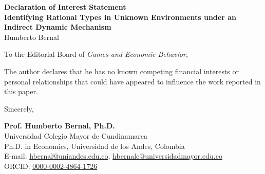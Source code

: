 \documentclass[12pt]{article}
\begin{document}
\singlespacing

\begin{center}
\textbf{Declaration of Interest Statement} \\
\vspace{1em}
\textbf{Identifying Rational Types in Unknown Environments under an Indirect Dynamic Mechanism} \\
Humberto Bernal
\end{center}

\vspace{3em}

\noindent To the Editorial Board of \textit{Games and Economic Behavior},

\vspace{2em}

\noindent The author declares that he has no known competing financial interests or personal relationships that could have appeared to influence the work reported in this paper.

\vspace{4em}

\begin{flushleft}
Sincerely,

\vspace{3em}

\textbf{Prof. Humberto Bernal, Ph.D.} \\
Universidad Colegio Mayor de Cundinamarca \\
Ph.D. in Economics, Universidad de los Andes, Colombia \\
E-mail: \href{mailto:hbernal@uniandes.edu.co}{hbernal@uniandes.edu.co}, \href{mailto:hbernalc@universidadmayor.edu.co}{hbernalc@universidadmayor.edu.co} \\
ORCID: \href{https://orcid.org/0000-0002-4864-1726}{0000-0002-4864-1726}
\end{flushleft}
\end{document}
